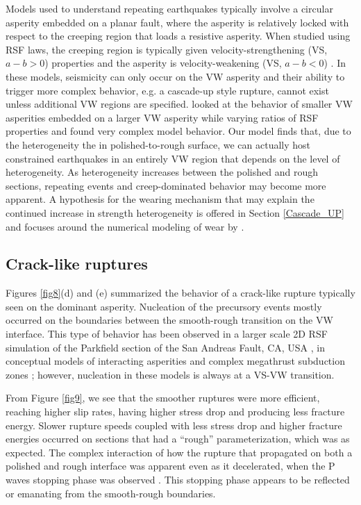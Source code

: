 \documentclass[preprint,1p, 10pt,authoryear]{elsarticle}
\begin{document}
Models used to understand repeating earthquakes typically involve a circular asperity embedded on a planar fault, where the asperity is relatively locked with respect to the creeping region that loads a resistive asperity. When studied using RSF laws, the creeping region is typically given velocity-strengthening (VS, $a-b>0$) properties and the asperity is velocity-weakening  (VS, $a-b<0$) \citep{Kato2003,Chen2009}. In these models, seismicity can only occur on the VW asperity and their ability to trigger more complex behavior, e.g. a cascade-up style rupture, cannot exist unless additional VW regions are specified. \citet{Noda2013} looked at the behavior of smaller VW asperities embedded on a larger VW asperity while varying ratios of RSF properties and found very complex model behavior. Our model finds that, due to the heterogeneity the in polished-to-rough surface, we can actually host constrained earthquakes in an entirely VW region that depends on the level of heterogeneity.  As heterogeneity increases between the polished and rough sections, repeating events and creep-dominated behavior may become more apparent.  A hypothesis for the wearing mechanism that may explain the continued increase in strength heterogeneity is offered in Section \ref{Cascade_UP} and focuses around the numerical modeling of wear by \citet{Aghababaei2016}.

\subsection{Crack-like ruptures}
Figures \ref{fig8}(d) and  (e) summarized the behavior of a crack-like rupture typically seen on the dominant asperity. Nucleation of the precursory events mostly occurred on the boundaries between the smooth-rough transition on the VW interface. This type of behavior has been observed in a larger scale 2D RSF simulation of the Parkfield section of the San Andreas Fault, CA, USA \citep{Barbot2012}, in conceptual models of interacting asperities \citep{Kato2003} and complex megathrust subduction zones \citep{Kaneko2010}; however, nucleation in these models is always at a VS-VW transition. 

From Figure \ref{fig9}, we see that the smoother ruptures were more efficient, reaching higher slip rates, having higher stress drop and producing less fracture energy. Slower rupture speeds coupled with less stress drop and higher fracture energies occurred on sections that had a ``rough'' parameterization, which was as expected.  The complex interaction of how the rupture that propagated on both a polished and rough interface was apparent even as it decelerated, when the P waves stopping phase was observed \citep{Madariaga1976}. This stopping phase appears to be reflected or emanating from the smooth-rough boundaries. 
\end{document}
